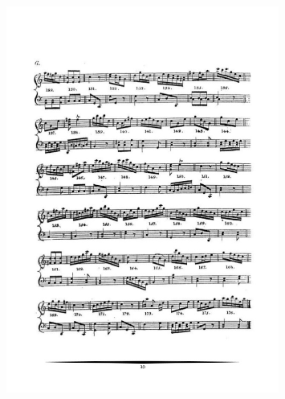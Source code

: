 \documentclass[a4paper, openright, 11pt, titlepage]{report}
\theoremstyle{definition}\newtheorem{defin}[propo]{Definition}
\theoremstyle{definition}\newtheorem{obser}[propo]{Remark}
\theoremstyle{definition}\newtheorem{ejem}[propo]{Ejemplo}
\theoremstyle{definition}\newtheorem{algoritmo}[propo]{Algoritmo}
\begin{document}
\begin{figure}[H]
    \centering
    \includegraphics[width = 0.8\textwidth]{mozart7.png}
\end{figure}
 \newpage
\end{document}

